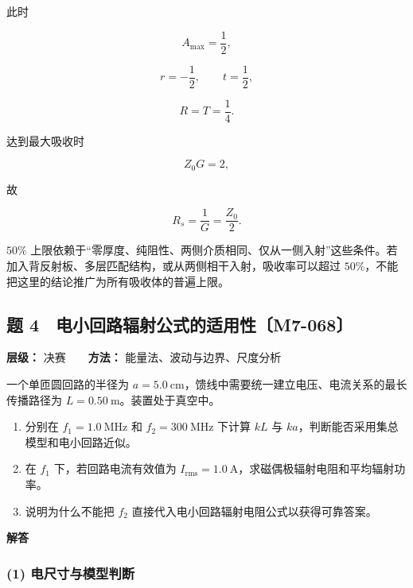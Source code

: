 此时

\[
\boxed{A_{\max}=\frac12},
\]

\[
r=-\frac12,
\qquad
t=\frac12,
\]

\[
R=T=\frac14.
\]

达到最大吸收时

\[
Z_0G=2,
\]

故

\[
\boxed{
R_s=\frac1G=\frac{Z_0}{2}}.
\]

\(50\%\)
上限依赖于``零厚度、纯阻性、两侧介质相同、仅从一侧入射''这些条件。若加入背反射板、多层匹配结构，或从两侧相干入射，吸收率可以超过
\(50\%\)，不能把这里的结论推广为所有吸收体的普遍上限。

\par{}
\noindent\begin{minipage}{\linewidth}

\subsection{题
4　电小回路辐射公式的适用性〔M7-068〕}\label{m7:ux9898-4-ux7535ux5c0fux56deux8defux8f90ux5c04ux516cux5f0fux7684ux9002ux7528ux6027m7-068}

\textbf{层级：} 决赛　　\textbf{方法：} 能量法、波动与边界、尺度分析

一个单匝圆回路的半径为
\(a=5.0\ \mathrm{cm}\)，馈线中需要统一建立电压、电流关系的最长传播路径为
\(L=0.50\ \mathrm m\)。装置处于真空中。

\begin{enumerate}
\def\labelenumi{(\arabic{enumi})}
\item
  分别在 \(f_1=1.0\ \mathrm{MHz}\) 和 \(f_2=300\ \mathrm{MHz}\) 下计算
  \(kL\) 与 \(ka\)，判断能否采用集总模型和电小回路近似。
\item
  在 \(f_1\) 下，若回路电流有效值为
  \(I_{\mathrm{rms}}=1.0\ \mathrm A\)，求磁偶极辐射电阻和平均辐射功率。
\item
  说明为什么不能把 \(f_2\) 直接代入电小回路辐射电阻公式以获得可靠答案。
\end{enumerate}

\end{minipage}\par

\textbf{解答}

\subsubsection{(1)
电尺寸与模型判断}\label{m7:ux7535ux5c3aux5bf8ux4e0eux6a21ux578bux5224ux65ad}

